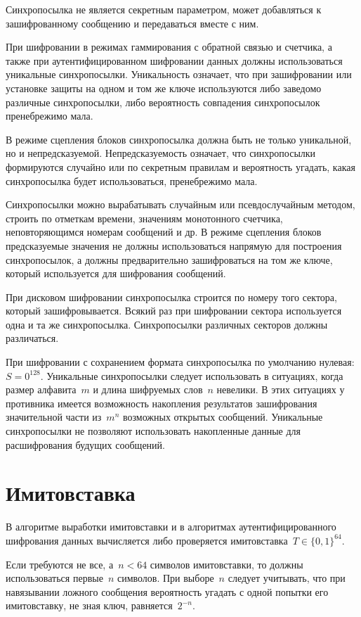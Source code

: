 Синхропосылка не является секретным параметром, 
может добавляться к зашифрованному сообщению и передаваться вместе с ним.

При шифровании в режимах гаммирования с обратной связью и счетчика, 
а также при аутентифицированном шифровании данных должны использоваться 
уникальные синхропосылки.
%
Уникальность означает, что при зашифровании или установке защиты 
на одном и том же ключе используются либо заведомо различные синхропосылки,
либо вероятность совпадения синхропосылок пренебрежимо мала.

В режиме сцепления блоков синхропосылка должна быть не только 
уникальной, но и непредсказуемой.
%
Непредсказуемость означает, что синхропосылки формируются случайно
или по секретным правилам и вероятность угадать, 
какая синхропосылка будет использоваться, пренебрежимо мала.

Синхропосылки можно вырабатывать случайным или псевдослучайным 
методом, строить по отметкам времени, значениям монотонного счетчика, 
неповторяющимся номерам сообщений и др.
%
В режиме сцепления блоков предсказуемые значения не должны
использоваться напрямую для построения синхропосылок, 
а должны предварительно зашифроваться на том же ключе, 
который используется для шифрования сообщений.

При дисковом шифровании синхропосылка строится по номеру того 
сектора, который зашифровывается. Всякий раз при шифровании сектора 
используется одна и та же синхропосылка. Синхропосылки различных секторов 
должны различаться.

При шифровании с сохранением формата синхропосылка по умолчанию 
нулевая: $S=0^{128}$.
%
Уникальные синхропосылки следует использовать в ситуациях,
когда размер алфавита~$m$ и длина шифруемых слов~$n$ невелики.
%
В этих ситуациях у противника имеется возможность накопления 
результатов зашифрования значительной части из~$m^n$ возможных открытых 
сообщений. 
%
Уникальные синхропосылки не позволяют использовать накопленные 
данные для расшифрования будущих сообщений.

\section{Имитовставка}\label{COMMON.MAC}

В алгоритме выработки имитовставки и в алгоритмах аутентифицированного шифрования
данных вычисляется либо проверяется имитовставка~$T\in\{0,1\}^{64}$.

Если требуются не все, а~$n<64$ символов имитовставки, 
то должны использоваться первые~$n$ символов.
%
При выборе~$n$ следует учитывать, что при навязывании ложного сообщения 
вероятность угадать с одной попытки его имитовставку, не зная ключ,
равняется~$2^{-n}$.

